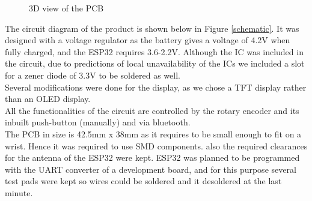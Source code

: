 \documentclass{article}
\begin{document}
        \begin{figure}[!htb]
                \centering
                \caption{3D view of the PCB}
                \label{pcb3d}
            \end{figure}
        The circuit diagram of the product is shown below in Figure \ref{schematic}. It was designed with a voltage regulator as the battery gives a voltage of 4.2V when fully charged, and the ESP32 requires 3.6-2.2V. Although the IC was included in the circuit, due to predictions of local unavailability of the ICs we included a slot for a zener diode of 3.3V to be soldered as well.\\
        
        Several modifications were done for the display, as we chose a TFT display rather than an OLED display.\\
        
        All the functionalities of the circuit are controlled by the rotary encoder and its inbuilt push-button (manually) and via bluetooth.\\
        
        The PCB in size is 42.5mm x 38mm as it requires to be small enough to fit on a wrist. Hence it was required to use SMD components. also the required clearances for the antenna of the ESP32 were kept. ESP32 was planned to be programmed with the UART converter of a development board, and for this purpose several test pads were kept so wires could be soldered and it desoldered at the last minute.
\end{document}
